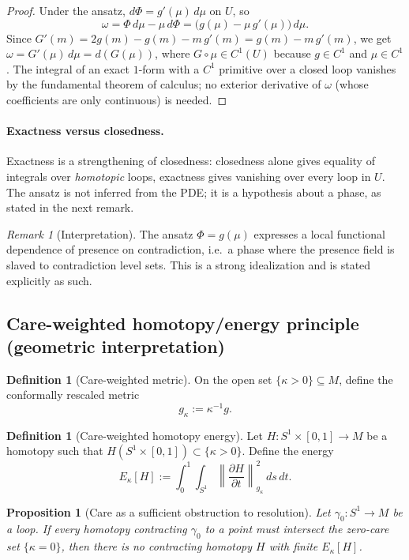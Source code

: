 \documentclass[11pt]{article}
\theoremstyle{plain}
\newtheorem{proposition}[theorem]{Proposition}
\theoremstyle{definition}
\newtheorem{definition}[theorem]{Definition}
\theoremstyle{remark}
\newtheorem{remark}[theorem]{Remark}
\begin{document}
\begin{proof}
Under the ansatz, \(d\Phi=g'(\mu)\,d\mu\) on \(U\), so
\[
\omega=\Phi\,d\mu-\mu\,d\Phi=\big(g(\mu)-\mu\,g'(\mu)\big)\,d\mu .
\]
Since \(G'(m)=2g(m)-g(m)-m\,g'(m)=g(m)-m\,g'(m)\), we get \(\omega=G'(\mu)\,d\mu=d(G(\mu))\), where \(G\circ\mu\in C^1(U)\) because \(g\in C^1\) and \(\mu\in C^1\). The integral of an exact \(1\)-form with a \(C^1\) primitive over a closed loop vanishes by the fundamental theorem of calculus; no exterior derivative of \(\omega\) (whose coefficients are only continuous) is needed.
\end{proof}

\paragraph{Exactness versus closedness.} Exactness is a strengthening of closedness: closedness alone gives equality of integrals over \emph{homotopic} loops, exactness gives vanishing over every loop in \(U\). The ansatz is not inferred from the PDE; it is a hypothesis about a phase, as stated in the next remark.

\begin{remark}[Interpretation]
The ansatz \(\Phi=g(\mu)\) expresses a local functional dependence of presence on contradiction, i.e.\ a phase where the presence field is slaved to contradiction level sets.
This is a strong idealization and is stated explicitly as such.
\end{remark}

\subsection{Care-weighted homotopy/energy principle (geometric interpretation)}
\begin{definition}[Care-weighted metric]
On the open set \(\{\kappa>0\}\subseteq M\), define the conformally rescaled metric
\[
g_\kappa := \kappa^{-1} g.
\]
\end{definition}

\begin{definition}[Care-weighted homotopy energy]
Let \(H:S^1\times[0,1]\to M\) be a homotopy such that \(H(S^1\times[0,1])\subset \{\kappa>0\}\).
Define the energy
\[
E_\kappa[H] := \int_0^1\int_{S^1} \left\|\frac{\partial H}{\partial t}\right\|_{g_\kappa}^2\,ds\,dt.
\]
\end{definition}

\begin{proposition}[Care as a sufficient obstruction to resolution]\label{prop:careObstruction}
Let \(\gamma_0:S^1\to M\) be a loop. If every homotopy contracting \(\gamma_0\) to a point must intersect the zero-care set \(\{\kappa=0\}\), then there is no contracting homotopy \(H\) with finite \(E_\kappa[H]\).
\end{proposition}
\end{document}
